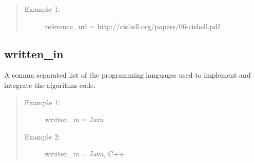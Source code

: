 \begin{quote}
\begin{description}
  \item[Example 1:] reference\_url = http://cishell.org/papers/06-cishell.pdf 
\end{description}
\end{quote}


\subsection*{written\_in}
A comma separated list of the programming languages used to implement and
integrate the algorithm code.

\begin{quote}
\begin{description}
  \item[Example 1:] written\_in = Java
  \item[Example 2:] written\_in = Java, C++ 
\end{description}
\end{quote}
